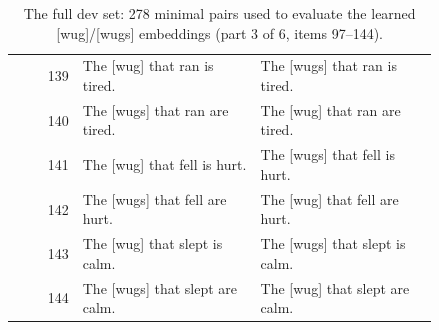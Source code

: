 \begin{table}[p]
\begin{tabular}{@{}rp{0.42\linewidth}p{0.42\linewidth}@{}}
139 & The {[}wug{]} that ran is tired. & The {[}wugs{]} that ran is tired. \\
140 & The {[}wugs{]} that ran are tired. & The {[}wug{]} that ran are tired. \\
141 & The {[}wug{]} that fell is hurt. & The {[}wugs{]} that fell is hurt. \\
142 & The {[}wugs{]} that fell are hurt. & The {[}wug{]} that fell are hurt. \\
143 & The {[}wug{]} that slept is calm. & The {[}wugs{]} that slept is calm. \\
144 & The {[}wugs{]} that slept are calm. & The {[}wug{]} that slept are calm. \\
\hline
\end{tabular}
\caption{The full dev set: 278 minimal pairs used to evaluate the learned {[}wug{]}/{[}wugs{]} embeddings (part 3 of 6, items 97--144).}
\label{tab:dev-set-3}
\end{table}

